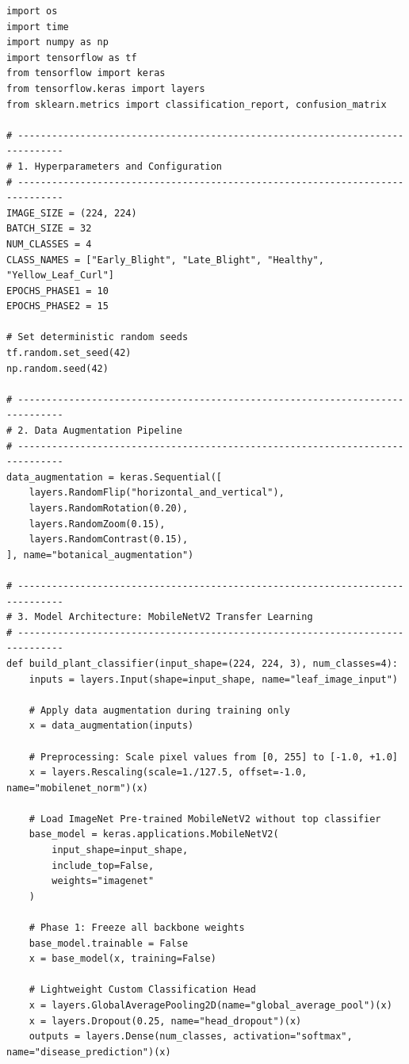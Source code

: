 \begin{lstlisting}[style=pythonstyle, caption={Complete Transfer Learning, Fine-Tuning, and Quantization Pipeline.}, label={lst:plant_disease_code}]
import os
import time
import numpy as np
import tensorflow as tf
from tensorflow import keras
from tensorflow.keras import layers
from sklearn.metrics import classification_report, confusion_matrix

# ------------------------------------------------------------------------------
# 1. Hyperparameters and Configuration
# ------------------------------------------------------------------------------
IMAGE_SIZE = (224, 224)
BATCH_SIZE = 32
NUM_CLASSES = 4
CLASS_NAMES = ["Early_Blight", "Late_Blight", "Healthy", "Yellow_Leaf_Curl"]
EPOCHS_PHASE1 = 10
EPOCHS_PHASE2 = 15

# Set deterministic random seeds
tf.random.set_seed(42)
np.random.seed(42)

# ------------------------------------------------------------------------------
# 2. Data Augmentation Pipeline
# ------------------------------------------------------------------------------
data_augmentation = keras.Sequential([
    layers.RandomFlip("horizontal_and_vertical"),
    layers.RandomRotation(0.20),
    layers.RandomZoom(0.15),
    layers.RandomContrast(0.15),
], name="botanical_augmentation")

# ------------------------------------------------------------------------------
# 3. Model Architecture: MobileNetV2 Transfer Learning
# ------------------------------------------------------------------------------
def build_plant_classifier(input_shape=(224, 224, 3), num_classes=4):
    inputs = layers.Input(shape=input_shape, name="leaf_image_input")
    
    # Apply data augmentation during training only
    x = data_augmentation(inputs)
    
    # Preprocessing: Scale pixel values from [0, 255] to [-1.0, +1.0]
    x = layers.Rescaling(scale=1./127.5, offset=-1.0, name="mobilenet_norm")(x)
    
    # Load ImageNet Pre-trained MobileNetV2 without top classifier
    base_model = keras.applications.MobileNetV2(
        input_shape=input_shape,
        include_top=False,
        weights="imagenet"
    )
    
    # Phase 1: Freeze all backbone weights
    base_model.trainable = False
    x = base_model(x, training=False)
    
    # Lightweight Custom Classification Head
    x = layers.GlobalAveragePooling2D(name="global_average_pool")(x)
    x = layers.Dropout(0.25, name="head_dropout")(x)
    outputs = layers.Dense(num_classes, activation="softmax", name="disease_prediction")(x)
    

\end{lstlisting}
